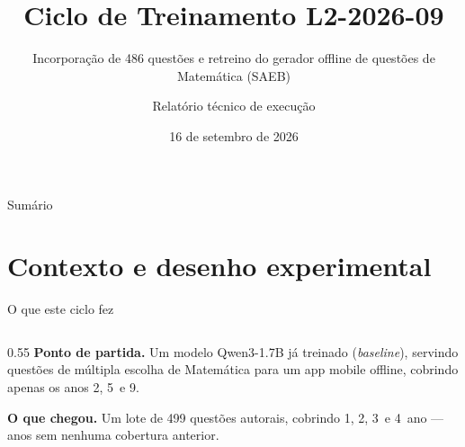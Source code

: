 \documentclass[aspectratio=169,11pt]{beamer}
\title[Ciclo L2-2026-09 — Qwen3-1.7B SAEB]{Ciclo de Treinamento L2-2026-09}
\subtitle{Incorporação de 486 questões e retreino do gerador offline de questões de Matemática (SAEB)}
\author{Relatório técnico de execução}
\institute{Pipeline QLoRA + GGUF — Qwen3-1.7B}
\date{16 de setembro de 2026}
\begin{document}
\begin{frame}
  \titlepage
\end{frame}

\begin{frame}{Sumário}
  \tableofcontents
\end{frame}

\section{Contexto e desenho experimental}

\begin{frame}{O que este ciclo fez}
  \begin{columns}[T]
    \begin{column}{0.55\textwidth}
      \textbf{Ponto de partida.} Um modelo Qwen3-1.7B já treinado (\emph{baseline}),
      servindo questões de múltipla escolha de Matemática para um app mobile
      offline, cobrindo apenas os anos 2\textordmasculine, 5\textordmasculine\ e 9\textordmasculine.

      \vspace{0.4cm}
      \textbf{O que chegou.} Um lote de 499 questões autorais, cobrindo
      1\textordmasculine, 2\textordmasculine, 3\textordmasculine\ e 4\textordmasculine\ ano — anos sem nenhuma cobertura anterior.


\end{column}
\end{columns}
\end{frame}
\end{document}
